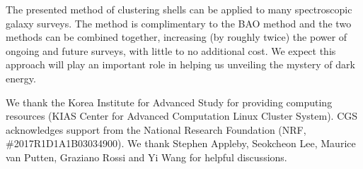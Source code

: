 \documentclass[prl,twocolumn,superscriptaddress,aps,amsmath,amssymb,nofootinbib,altaffilletter]{revtex4}
\begin{document}
The presented method of clustering shells can be applied to many spectroscopic galaxy surveys. 
The method is complimentary to the BAO method and the two methods can be combined together, 
increasing (by roughly twice) the power of ongoing and future surveys, with little to no additional cost.
We expect this approach will play an important role in helping us unveiling the mystery of dark energy.




\begin{acknowledgments}
We thank the Korea Institute for Advanced Study for providing computing resources (KIAS Center for Advanced Computation Linux Cluster System).
CGS acknowledges support from the National Research Foundation (NRF,  \#2017R1D1A1B03034900). 
We thank Stephen Appleby, Seokcheon Lee, Maurice van Putten, Graziano Rossi and Yi Wang for helpful discussions.
\end{acknowledgments}





\end{document}
